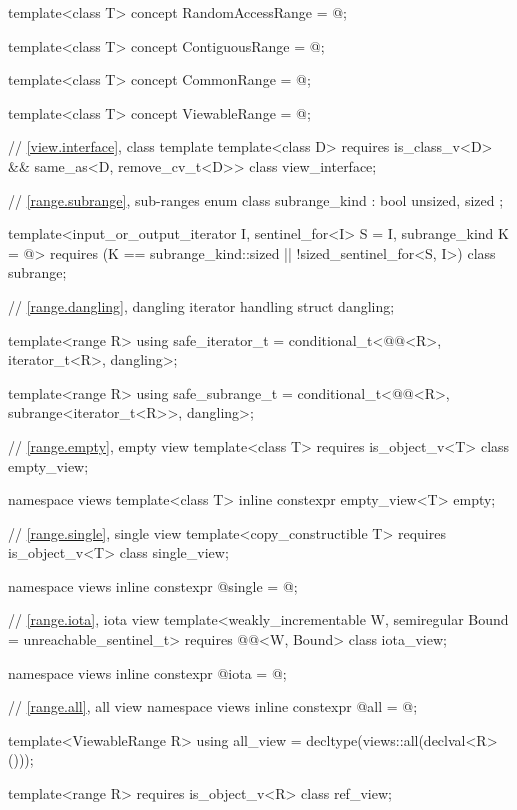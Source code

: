 \begin{codeblock}
{  template<class T>
    concept RandomAccessRange = @\seebelow@;

  template<class T>
    concept ContiguousRange = @\seebelow@;

  template<class T>
    concept CommonRange = @\seebelow@;

  template<class T>
    concept ViewableRange = @\seebelow@;

  // \ref{view.interface}, class template 
  template<class D>
    requires is_class_v<D> && same_as<D, remove_cv_t<D>>
  class view_interface;

  // \ref{range.subrange}, sub-ranges
  enum class subrange_kind : bool { unsized, sized };

  template<input_or_output_iterator I, sentinel_for<I> S = I, subrange_kind K = @\seebelow@>
    requires (K == subrange_kind::sized || !sized_sentinel_for<S, I>)
  class subrange;

  // \ref{range.dangling}, dangling iterator handling
  struct dangling;

  template<range R>
    using safe_iterator_t = conditional_t<@@<R>, iterator_t<R>, dangling>;

  template<range R>
    using safe_subrange_t =
      conditional_t<@@<R>, subrange<iterator_t<R>>, dangling>;

  // \ref{range.empty}, empty view
  template<class T>
    requires is_object_v<T>
  class empty_view;

  namespace views {
    template<class T>
      inline constexpr empty_view<T> empty{};
  }

  // \ref{range.single}, single view
  template<copy_constructible T>
    requires is_object_v<T>
  class single_view;

  namespace views { inline constexpr @\unspec@ single = @\unspec@; }

  // \ref{range.iota}, iota view
  template<weakly_incrementable W, semiregular Bound = unreachable_sentinel_t>
    requires @@<W, Bound>
  class iota_view;

  namespace views { inline constexpr @\unspec@ iota = @\unspec@; }

  // \ref{range.all}, all view
  namespace views { inline constexpr @\unspec@ all = @\unspec@; }

  template<ViewableRange R>
    using all_view = decltype(views::all(declval<R>()));

  template<range R>
    requires is_object_v<R>
  class ref_view;

}
\end{codeblock}
